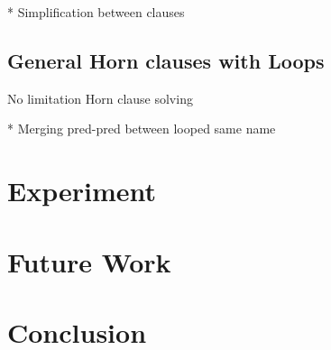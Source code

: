 \documentclass[a4paper,12pt]{article}
\begin{document}
* Simplification between clauses


\subsection{General Horn clauses with Loops}

No limitation Horn clause solving

* Merging pred-pred between looped same name

\section{Experiment}
\section{Future Work}
\section{Conclusion}



\end{document}
